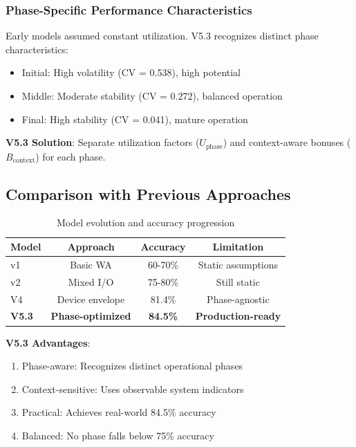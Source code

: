 \subsubsection{Phase-Specific Performance Characteristics}

Early models assumed constant utilization. V5.3 recognizes distinct phase characteristics:
\begin{itemize}
    \item Initial: High volatility (CV = 0.538), high potential
    \item Middle: Moderate stability (CV = 0.272), balanced operation
    \item Final: High stability (CV = 0.041), mature operation
\end{itemize}

\textbf{V5.3 Solution}: Separate utilization factors ($U_{\text{phase}}$) and context-aware bonuses ($B_{\text{context}}$) for each phase.

\subsection{Comparison with Previous Approaches}

\begin{table}[H]
\centering
\begin{tabular}{@{}lccc@{}}
\toprule
\textbf{Model} & \textbf{Approach} & \textbf{Accuracy} & \textbf{Limitation} \\
\midrule
v1 & Basic WA & 60-70\% & Static assumptions \\
v2 & Mixed I/O & 75-80\% & Still static \\
V4 & Device envelope & 81.4\% & Phase-agnostic \\
\textbf{V5.3} & \textbf{Phase-optimized} & \textbf{84.5\%} & \textbf{Production-ready} \\
\bottomrule
\end{tabular}
\caption{Model evolution and accuracy progression}
\label{tab:model_evolution}
\end{table}

\textbf{V5.3 Advantages}:
\begin{enumerate}
    \item Phase-aware: Recognizes distinct operational phases
    \item Context-sensitive: Uses observable system indicators
    \item Practical: Achieves real-world 84.5\% accuracy
    \item Balanced: No phase falls below 75\% accuracy
\end{enumerate}

